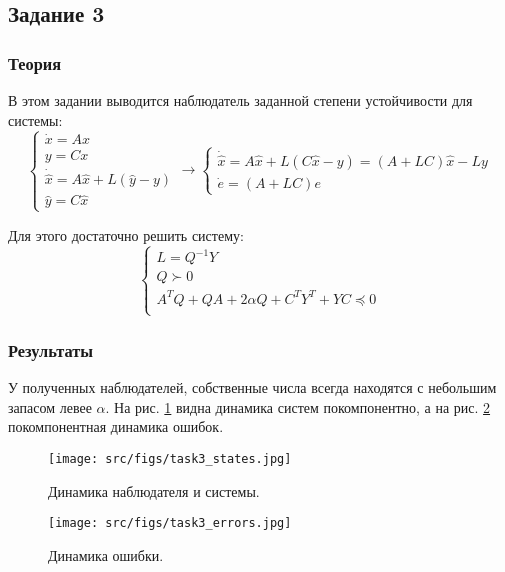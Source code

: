 \subsection{Задание 3}

\subsubsection{Теория}

В этом задании выводится наблюдатель заданной степени устойчивости для системы:
\[
        \begin{cases}
                \dot{x} = A x \\
                y = C x \\
                \dot{\hat{x}} = A \hat{x} + L(\hat{y} - y) \\
                \hat{y} = C \hat{x}
        \end{cases} \rightarrow
        \begin{cases}
            \dot{\hat{x}} = A \hat{x} + L(C \hat{x} - y) = (A + LC )\hat{x} - Ly \\
            \dot{e} = (A + LC)e
            
    \end{cases}
\]

Для этого достаточно решить систему:
\[
        \begin{cases}
                L = Q^{-1}Y\\
                Q \succ 0 \\
                A^TQ + QA + 2 \alpha Q + C^T Y^T + YC \preccurlyeq 0  \\
        \end{cases} 
\]
\subsubsection{Результаты}
У полученных наблюдателей, собственные числа всегда находятся с небольшим запасом левее \(\alpha\). На рис. \ref{fig:task3_states} видна динамика систем покомпонентно, а на рис. \ref{fig:task3_errors} покомпонентная динамика ошибок.
\begin{figure}[ht!]
  \centering
  \texttt{[image: src/figs/task3\_states.jpg]}
  \caption{Динамика наблюдателя и системы.}
  \label{fig:task3_states}
\end{figure}
\begin{figure}[ht!]
  \centering
  \texttt{[image: src/figs/task3\_errors.jpg]}
  \caption{Динамика ошибки.}
  \label{fig:task3_errors}
\end{figure}


